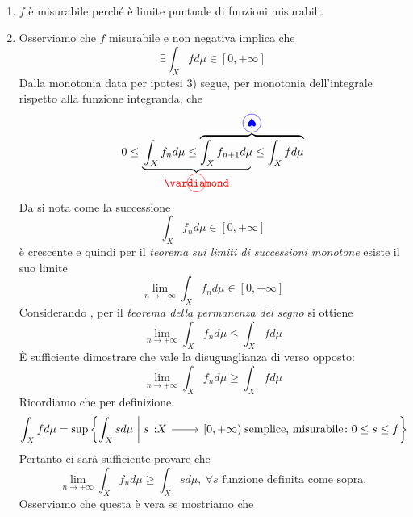 \begin{demonstrationcaputwt}~
	\begin{enumerate}[label=\Roman*]
		\item $f$ è misurabile perché è limite puntuale di funzioni misurabili.
		\item Osserviamo che $f$ misurabile e non negativa implica che
		\begin{equation*}
			\exists\int_Xfd\mu\in\left[0,+\infty\right]
		\end{equation*}
		Dalla monotonia data per ipotesi 3) segue, per monotonia dell'integrale rispetto alla funzione integranda, che
	\begin{equation*}
		0\leq\lefteqn{\underbrace{\phantom{\int_Xf_nd\mu\leq\int_Xf_{n+1}d\mu}}_{\circled[red]{\vardiamond}}}\int_Xf_nd\mu\leq
		\overbrace{\int_Xf_{n+1}d\mu\leq \int_Xfd\mu}^{\circled[blue]{\spadesuit}}
	\end{equation*}
		Da \circled[red]{\vardiamond} si nota come la successione
	\begin{equation*}
		\int_Xf_nd\mu\in\left[0,+\infty\right]
	\end{equation*}
		è crescente e quindi per il \textit{teorema sui limiti di successioni monotone} esiste il suo limite
\begin{equation*}
	\lim_{n\to+\infty}\int_Xf_nd\mu\in\left[0,+\infty\right]
\end{equation*}
Considerando \circled[blue]{\spadesuit}, per il \textit{teorema della permanenza del segno} si ottiene
\begin{equation*}
	\lim_{n\to+\infty}\int_Xf_nd\mu\leq \int_Xfd\mu
\end{equation*}
È sufficiente dimostrare che vale la disuguaglianza di verso opposto:
\begin{equation*}
	\lim_{n\to+\infty}\int_Xf_nd\mu\geq \int_Xfd\mu
\end{equation*}
Ricordiamo che per definizione
\begin{equation*}
	\int_Xfd\mu=\sup\left\{\int_Xsd\mu \ \middle| \  \funz{s}{X}{\left[0,+\infty\right)}\text{ semplice, misurabile}\colon0\leq s\leq f\right\}
\end{equation*}
Pertanto ci sarà sufficiente provare che
\begin{equation*}
	\lim_{n\to+\infty}\int_Xf_nd\mu\geq \int_Xsd\mu,\ \forall s\text{ funzione definita come sopra.}
\end{equation*}
Osserviamo che questa è vera se mostriamo che
\begin{equation*}

\end{equation*}
\end{enumerate}
\end{demonstrationcaputwt}
